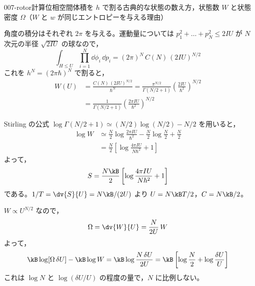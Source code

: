 \documentclass[uplatex,dvipdfmx,a4paper,11pt]{jsarticle}
\begin{document}
\begin{mondai}{007-rotor}{計算}{位相空間体積を $h$ で割る古典的な状態の数え方，状態数 $W$ と状態密度 $\Omega$（$W$ と $w$ が同じエントロピーを与える理由）}
\begin{tadashii}
 角度の積分はそれぞれ $2\pi$ を与える。運動量については $p_{1}^{2}+\dots+p_{N}^{2}\le2IU$ が $N$ 次元の半径 $\sqrt{2IU}$ の球なので，
\[\int_{H\le U}\prod_{i=1}^{N}\dd\phi_{i}\,\dd p_{i}=(2\pi)^{N}\,C(N)\,(2IU)^{N/2}\]
これを $h^{N}=(2\pi\hbar)^{N}$ で割ると，
\begin{align*}
W(U)&=\frac{C(N)\,(2IU)^{N/2}}{\hbar^{N}}=\frac{\pi^{N/2}}{\Gamma(N/2+1)}\left(\frac{2IU}{\hbar^{2}}\right)^{N/2}\\
&=\frac{1}{\Gamma(N/2+1)}\left(\frac{2\pi IU}{\hbar^{2}}\right)^{N/2}
\end{align*}

 Stirling の公式 $\log\Gamma(N/2+1)\simeq(N/2)\log(N/2)-N/2$ を用いると，
\begin{align*}
\log W&\simeq\frac{N}{2}\log\frac{2\pi IU}{\hbar^{2}}-\frac{N}{2}\log\frac{N}{2}+\frac{N}{2}\\
&=\frac{N}{2}\left[\log\frac{4\pi IU}{N\hbar^{2}}+1\right]
\end{align*}
よって，
\[S=\frac{N\kB}{2}\left[\log\frac{4\pi IU}{N\hbar^{2}}+1\right]\]
である。$1/T=\dv{S}{U}=N\kB/(2U)$ より $U=N\kB T/2$，$C=N\kB/2$。

 $W\propto U^{N/2}$ なので，
\[\Omega=\dv{W}{U}=\frac{N}{2U}\,W\]
よって，
\[\kB\log[\Omega\,\delta U]-\kB\log W=\kB\log\frac{N\,\delta U}{2U}=\kB\left[\log\frac{N}{2}+\log\frac{\delta U}{U}\right]\]
これは $\log N$ と $\log(\delta U/U)$ の程度の量で，$N$ に比例しない。


\end{tadashii}
\end{mondai}
\end{document}
